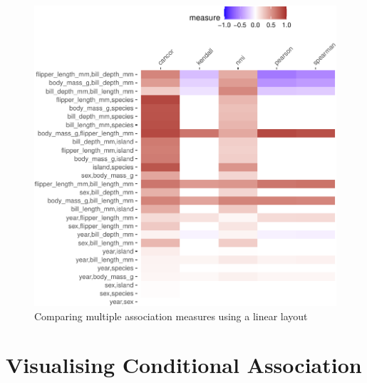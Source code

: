 \begin{Schunk}
\begin{figure}

{\centering \includegraphics{rj_paper_files/figure-latex/compare-linear-1} 

}

\caption[Comparing multiple association measures using a linear layout]{Comparing multiple association measures using a linear layout}\label{fig:compare-linear}
\end{figure}
\end{Schunk}

\hypertarget{visualising-conditional-association}{%
\section{Visualising Conditional
Association}\label{visualising-conditional-association}}

